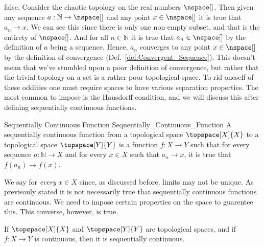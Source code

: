         false. Consider the chaotic topology on the real numbers
        $\nspace[]$. Then given any sequence
        $a:\mathbb{N}\rightarrow\nspace[]$ and any point $x\in\nspace[]$ it
        is true that $a_{n}\rightarrow{x}$. We can see this since there is
        only one non-empty subset, and that is the entirety of $\nspace[]$.
        And for all $n\in\mathbb{N}$ it is true that $a_{n}\in\nspace[]$ by
        the definition of $a$ being a sequence. Hence, $a_{n}$ converges to
        any point $x\in\nspace[]$ by the definition of convergence
        (Def.~\ref{def:Convergent_Sequence}). This doesn't mean that we've
        stumbled upon a poor definition of convergence, but rather that the
        trivial topology on a set is a rather poor topological space. To rid
        oneself of these oddities one must require spaces to have various
        separation properties. The most common to impose is the Hausdorff
        condition, and we will discuss this after defining sequentially
        continuous functions.
        \begin{fdefinition}{Sequentially Continuous Function}
                           {Sequentially_Continuous_Function}
            A sequentially continuous function from a topological space
            $\topspace[X]{X}$ to a topological space $\topspace[Y]{Y}$ is a
            function $f:X\rightarrow{Y}$ such that for every sequence
            $a:\mathbb{N}\rightarrow{X}$ and for every $x\in{X}$ such that
            $a_{n}\rightarrow{x}$, it is true that
            $f(a_{n})\rightarrow{f}(x)$.
        \end{fdefinition}
        We say for \textit{every} $x\in{X}$ since, as discussed before,
        limits may not be unique. As previsouly stated it is not necessarily
        true that sequentially continuous functions are continuous. We need
        to impose certain properties on the space to guarentee this. This
        converse, however, is true.
        \begin{theorem}
            \label{thm:Cont_is_Seq_Cont}%
            If $\topspace[X]{X}$ and $\topspace[Y]{Y}$ are topological
            spaces, and if $f:X\rightarrow{Y}$ is continuous, then it is
            sequentially continuous.
        \end{theorem}
